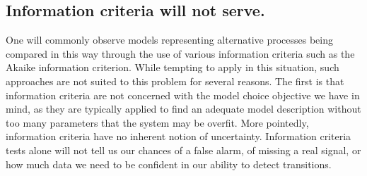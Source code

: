 \documentclass[authoryear,review,11pt]{elsarticle}
\begin{document}
%
%
%
%
%

\subsection*{Information criteria will not serve.}
One will commonly observe models representing alternative processes being compared in this way through 
the use of various information criteria such as the Akaike information criterion.  
While tempting to apply in this situation, such approaches are not suited to this problem for several reasons.  
The first is that information criteria are not concerned with the model choice objective we have in mind,
as they are typically applied to find an adequate model description without too many parameters that the system may be overfit.  
More pointedly, information criteria have no inherent notion of uncertainty.
Information criteria tests alone will not tell us our chances of a false alarm, of missing a real signal, 
or how much data we need to be confident in our ability to detect transitions.   
\end{document}
